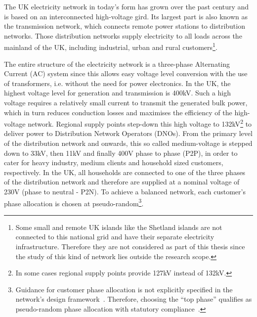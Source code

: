 The UK electricity network in today's form has grown over the past century and is based on an interconnected high-voltage gird.
Its largest part is also known as the transmission network, which connects remote power stations to distribution networks.
Those distribution networks supply electricity to all loads across the mainland of the UK, including industrial, urban and rural customers\footnote{Some small and remote UK islands like the Shetland islands are not connected to this national grid and have their separate electricity infrastructure. Therefore they are not considered as part of this thesis since the study of this kind of network lies outside the research scope.}.

The entire structure of the electricity network is a three-phase Alternating Current (AC) system since this allows easy voltage level conversion with the use of transformers, i.e. without the need for power electronics.
In the UK, the highest voltage level for generation and transmission is 400kV.
Such a high voltage requires a relatively small current to transmit the generated bulk power, which in turn reduces conduction losses and maximises the efficiency of the high-voltage network.
Regional supply points step-down this high voltage to 132kV\footnote{In some cases regional supply points provide 127kV instead of 132kV.} to deliver power to Distribution Network Operators (DNOs).
From the primary level of the distribution network and onwards, this so called medium-voltage is stepped down to 33kV, then 11kV and finally 400V phase to phase (P2P), in order to cater for heavy industry, medium clients and household sized customers, respectively.
In the UK, all households are connected to one of the three phases of the distribution network and therefore are supplied at a nominal voltage of 230V (phase to neutral - P2N).
To achieve a balanced network, each customer's phase allocation is chosen at pseudo-random\footnote{Guidance for customer phase allocation is not explicitly specified in the network's design framework~\cite{UKPowerNetworks2014}. Therefore, choosing the ``top phase'' qualifies as pseudo-random phase allocation with statutory compliance~\cite{StatutoryInstruments2015}.}.


